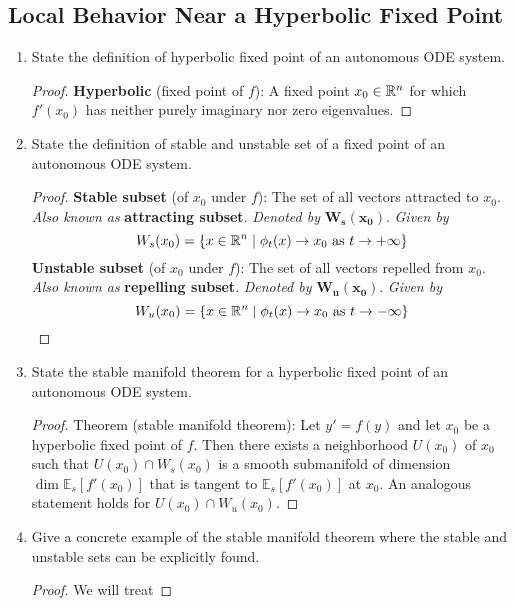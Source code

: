 \documentclass[../psets.tex]{subfiles}
\begin{document}
\subsection*{Local Behavior Near a Hyperbolic Fixed Point}
\begin{enumerate}
    \item State the definition of hyperbolic fixed point of an autonomous ODE system.
    \begin{proof}
        \textbf{Hyperbolic} (fixed point of $f$): A fixed point $x_0\in\mathbb{R}^n$ for which $f'(x_0)$ has neither purely imaginary nor zero eigenvalues.
    \end{proof}
    \item State the definition of stable and unstable set of a fixed point of an autonomous ODE system.
    \begin{proof}
        \textbf{Stable subset} (of $x_0$ under $f$): The set of all vectors attracted to $x_0$. \emph{Also known as} \textbf{attracting subset}. \emph{Denoted by} $\bm{W_s(x_0)}$. \emph{Given by}
        \begin{equation*}
            W_s(x_0) = \{x\in\mathbb{R}^n\mid\phi_t(x)\to x_0\text{ as }t\to +\infty\}
        \end{equation*}
        \textbf{Unstable subset} (of $x_0$ under $f$): The set of all vectors repelled from $x_0$. \emph{Also known as} \textbf{repelling subset}. \emph{Denoted by} $\bm{W_u(x_0)}$. \emph{Given by}
        \begin{equation*}
            W_u(x_0) = \{x\in\mathbb{R}^n\mid\phi_t(x)\to x_0\text{ as }t\to -\infty\}
        \end{equation*}
    \end{proof}
    \item State the stable manifold theorem for a hyperbolic fixed point of an autonomous ODE system.
    \begin{proof}
        Theorem (stable manifold theorem): Let $y'=f(y)$ and let $x_0$ be a hyperbolic fixed point of $f$. Then there exists a neighborhood $U(x_0)$ of $x_0$ such that $U(x_0)\cap W_s(x_0)$ is a smooth submanifold of dimension $\dim\mathbb{E}_s[f'(x_0)]$ that is tangent to $\mathbb{E}_s[f'(x_0)]$ at $x_0$. An analogous statement holds for $U(x_0)\cap W_u(x_0)$.
    \end{proof}
    \item Give a concrete example of the stable manifold theorem where the stable and unstable sets can be explicitly found.
    \begin{proof}
        We will treat

\end{proof}
\end{enumerate}
\end{document}
